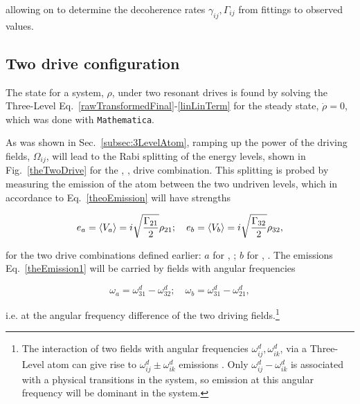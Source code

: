   \noindent allowing on to determine the decoherence rates  $ \gamma_{ij}, \Gamma_{ij} $ from fittings to observed values.
      
 \subsection{Two drive configuration\label{subsec:DoubleDrive}}
  The state for a system, $ \rho $, under two resonant drives is found by solving the Three-Level Eq.~\eqref{rawTransformedFinal}-\eqref{linLinTerm} for the steady state, $ \dot{\rho}=0 $, which was done with \texttt{Mathematica}.
  
  As was shown in Sec.~\ref{subsec:3LevelAtom}, ramping up the power of the driving fields, $ \Omega_{ij} $, will lead to the Rabi splitting of the energy levels, shown in Fig.~\ref{theTwoDrive} for the \lra{}, \lra{}, drive combination. This splitting is probed by measuring the emission of the atom between the two undriven levels, which in accordance to Eq.~\eqref{theoEmission} will have strengths
  
  \begin{equation}\label{theEmission1}
  	  	e_a=\left\langle V_{a}\right\rangle =  i\sqrt{\frac{\Gamma_{21}}{2}}\rho_{21};\quad e_b=\left\langle V_{{b}}\right\rangle =  i\sqrt{\frac{\Gamma_{32}}{2}}\rho_{32},
  \end{equation}
  
  \noindent for the two drive combinations defined earlier: $ a $ for \lra{}, \lra{}; $ b $ for \lra{}, \lra{}. The emissions Eq.~\eqref{theEmission1} will be carried by fields with angular frequencies
  
  \begin{equation}\label{theoEmissionFrequency}
  	\omega_{a} = \omega_{31}^{d} - \omega_{32}^{d};\quad \omega_{b} = \omega_{31}^{d} - \omega_{21}^{d}, 
  \end{equation}
  
  \noindent i.e. at the angular frequency difference of the two driving fields.\footnote{The interaction of two fields with angular frequencies $ \omega_{ij}^{d},\omega_{ik}^{d} $, via a Three-Level atom can give rise to $ \omega_{ij}^{d}\pm\omega_{ik}^{d} $ emissions  \cite{giantCrossKerrEffect_2013}. Only $ \omega_{ij}^{d}-\omega_{ik}^{d} $ is associated with a physical \lra{} transitions in the system, so emission at this angular frequency will be dominant in the system.}
  
